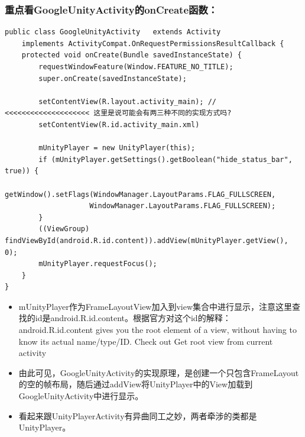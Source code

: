 \documentclass[9pt, b5paper]{article}
\begin{document}
\subsubsection{重点看GoogleUnityActivity的onCreate函数：}
\label{sec-2-2-3}
\begin{verbatim}
public class GoogleUnityActivity   extends Activity
    implements ActivityCompat.OnRequestPermissionsResultCallback {
    protected void onCreate(Bundle savedInstanceState) {
        requestWindowFeature(Window.FEATURE_NO_TITLE);
        super.onCreate(savedInstanceState);

        setContentView(R.layout.activity_main); // <<<<<<<<<<<<<<<<<<<< 这里是说可能会有两三种不同的实现方式吗?
        setContentView(R.id.activity_main.xml)

        mUnityPlayer = new UnityPlayer(this);
        if (mUnityPlayer.getSettings().getBoolean("hide_status_bar", true)) {
            getWindow().setFlags(WindowManager.LayoutParams.FLAG_FULLSCREEN,
                    WindowManager.LayoutParams.FLAG_FULLSCREEN);
        }
        ((ViewGroup) findViewById(android.R.id.content)).addView(mUnityPlayer.getView(), 0);
        mUnityPlayer.requestFocus();
    }
}
\end{verbatim}
\begin{itemize}
\item mUnityPlayer作为FrameLayoutView加入到view集合中进行显示，注意这里查找的id是android.R.id.content。根据官方对这个id的解释：android.R.id.content gives you the root element of a view, without having to know its actual name/type/ID. Check out Get root view from current activity
\item 由此可见，GoogleUnityActivity的实现原理，是创建一个只包含FrameLayout的空的帧布局，随后通过addView将UnityPlayer中的View加载到GoogleUnityActivity中进行显示。
\item 看起来跟UnityPlayerActivity有异曲同工之妙，两者牵涉的类都是UnityPlayer。
\end{itemize}
\end{document}
